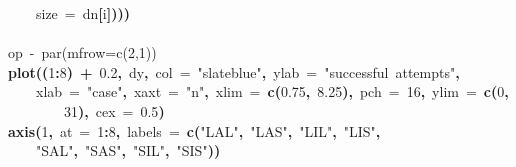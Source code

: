 \documentclass{article}
\makeatletter
\newcommand{\hlnumber}[1]{\textcolor[rgb]{0,0,0}{#1}}%
\newcommand{\hlfunctioncall}[1]{\textcolor[rgb]{.5,0,.33}{\textbf{#1}}}%
\newcommand{\hlstring}[1]{\textcolor[rgb]{.6,.6,1}{#1}}%
\newcommand{\hlkeyword}[1]{\textbf{#1}}%
\newcommand{\hlargument}[1]{\textcolor[rgb]{.69,.25,.02}{#1}}%
\newcommand{\hlcomment}[1]{\textcolor[rgb]{.18,.6,.34}{#1}}%
\newcommand{\hlsymbol}[1]{#1}%
\newcommand{\hlstd}[1]{\textcolor[rgb]{0,0,0}{#1}}%
\newenvironment{kframe}{%
 \def\FrameCommand##1{\hskip\@totalleftmargin \hskip-\fboxsep
 \colorbox{shadecolor}{##1}\hskip-\fboxsep
     \hskip-\linewidth \hskip-\@totalleftmargin \hskip\columnwidth}%
 \MakeFramed {\advance\hsize-\width
   \@totalleftmargin\z@ \linewidth\hsize
   \@setminipage}}%
 {\par\unskip\endMakeFramed}
\newenvironment{knitrout}{}{} %
\makeatother
\begin{document}
\begin{knitrout}
{\begin{kframe}
\begin{flushleft}
\hlstd{}{\ }{\ }{\ }{\ }\hlargument{size}{\ }\hlargument{=}{\ }\hlsymbol{d}\hlkeyword{\usebox{\hlnormalsizeboxdollar}}\hlsymbol{n}\hlkeyword{[}\hlsymbol{i}\hlkeyword{]}\hlkeyword{)}\hlkeyword{)}\hlkeyword{)}\hspace*{\fill}\\
\hlstd{}\hspace*{\fill}\\
\hlstd{}\hlcomment{\usebox{\hlnormalsizeboxhash}op{\ }\usebox{\hlnormalsizeboxlessthan}-{\ }par(mfrow=c(2,1))}\hspace*{\fill}\\
\hlstd{}\hlfunctioncall{plot}\hlkeyword{(}\hlkeyword{(}\hlnumber{1}\hlkeyword{:}\hlnumber{8}\hlkeyword{)}{\ }\hlkeyword{+}{\ }\hlnumber{0.2}\hlkeyword{,}{\ }\hlsymbol{d}\hlkeyword{\usebox{\hlnormalsizeboxdollar}}\hlsymbol{y}\hlkeyword{,}{\ }\hlargument{col}{\ }\hlargument{=}{\ }\hlstring{"{}slateblue"{}}\hlkeyword{,}{\ }\hlargument{ylab}{\ }\hlargument{=}{\ }\hlstring{"{}successful{\ }attempts"{}}\hlkeyword{,}\hspace*{\fill}\\
\hlstd{}{\ }{\ }{\ }{\ }\hlargument{xlab}{\ }\hlargument{=}{\ }\hlstring{"{}case"{}}\hlkeyword{,}{\ }\hlargument{xaxt}{\ }\hlargument{=}{\ }\hlstring{"{}n"{}}\hlkeyword{,}{\ }\hlargument{xlim}{\ }\hlargument{=}{\ }\hlfunctioncall{c}\hlkeyword{(}\hlnumber{0.75}\hlkeyword{,}{\ }\hlnumber{8.25}\hlkeyword{)}\hlkeyword{,}{\ }\hlargument{pch}{\ }\hlargument{=}{\ }\hlnumber{16}\hlkeyword{,}{\ }\hlargument{ylim}{\ }\hlargument{=}{\ }\hlfunctioncall{c}\hlkeyword{(}\hlnumber{0}\hlkeyword{,}\hspace*{\fill}\\
\hlstd{}{\ }{\ }{\ }{\ }{\ }{\ }{\ }{\ }\hlnumber{31}\hlkeyword{)}\hlkeyword{,}{\ }\hlargument{cex}{\ }\hlargument{=}{\ }\hlnumber{0.5}\hlkeyword{)}\hspace*{\fill}\\
\hlstd{}\hlfunctioncall{axis}\hlkeyword{(}\hlnumber{1}\hlkeyword{,}{\ }\hlargument{at}{\ }\hlargument{=}{\ }\hlnumber{1}\hlkeyword{:}\hlnumber{8}\hlkeyword{,}{\ }\hlargument{labels}{\ }\hlargument{=}{\ }\hlfunctioncall{c}\hlkeyword{(}\hlstring{"{}LAL"{}}\hlkeyword{,}{\ }\hlstring{"{}LAS"{}}\hlkeyword{,}{\ }\hlstring{"{}LIL"{}}\hlkeyword{,}{\ }\hlstring{"{}LIS"{}}\hlkeyword{,}\hspace*{\fill}\\
\hlstd{}{\ }{\ }{\ }{\ }\hlstring{"{}SAL"{}}\hlkeyword{,}{\ }\hlstring{"{}SAS"{}}\hlkeyword{,}{\ }\hlstring{"{}SIL"{}}\hlkeyword{,}{\ }\hlstring{"{}SIS"{}}\hlkeyword{)}\hlkeyword{)}\hspace*{\fill}\\

\end{flushleft}
\end{kframe}}
\end{knitrout}
\end{document}
